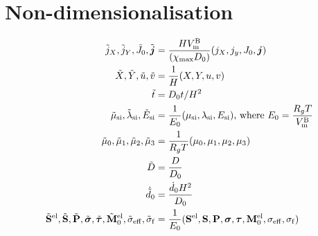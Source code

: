 \section{Non-dimensionalisation}\label{section:nonDim}
\begin{align}
    \tilde{j}_X, \tilde{j}_Y, \tilde{J}_0, \tilde{\bm{j}} &=  \frac{H V_{\rm{m}}^{\rm{B}}}{(\chi_{{\rm{max}}} D_0)} (j_X, j_y, J_0, \bm{j}) \\
    \tilde{X}, \tilde{Y}, \tilde{u}, \tilde{v} &= \frac{1}{H}(X, Y, u, v) \\
    \tilde{t} &= D_0 t/H^2 \\
     \tilde{\mu}_{\text{si}}, \tilde{\lambda}_{\text{si}}, \tilde{E}_{\text{si}} &= \frac{1}{E_0} (\mu_{\text{si}}, \lambda_{\text{si}}, E_{\text{si}}) 
     \text{, where }  E_0 = \frac{R_g T}{V_{\rm{m}}^{\rm{B}}} \\
     \tilde{\mu}_0, \tilde{\mu}_1, \tilde{\mu}_2, \tilde{\mu}_3 &= \frac{1}{R_g T}(\mu_0, \mu_1, \mu_2, \mu_3) \\
     \tilde{D} &= \frac{D}{D_0} \\
     \dot{\tilde{d}}_{0} &= \frac{{\dot{d}}_0 H^2}{D_0} \\
     \tilde{\mathbf{S}}^{{\rm{el}}}, \tilde{\mathbf{S}}, \tilde{\mathbf{P}}, \tilde{\bm{\sigma}}, \tilde{\bm{\tau}}, \tilde{\mathbf{M}}^{{\rm{el}}}_{0}, \tilde{\sigma}_{\rm{eff}}, \tilde{\sigma}_{\rm{f}} &= \frac{1}{E_0}(\mathbf{S}^{{\rm{el}}}, \mathbf{S}, \mathbf{P}, \bm{\sigma}, \bm{\tau}, \mathbf{M}^{{\rm{el}}}_{0}, \sigma_{\rm{eff}}, \sigma_{\rm{f}})
\end{align}

